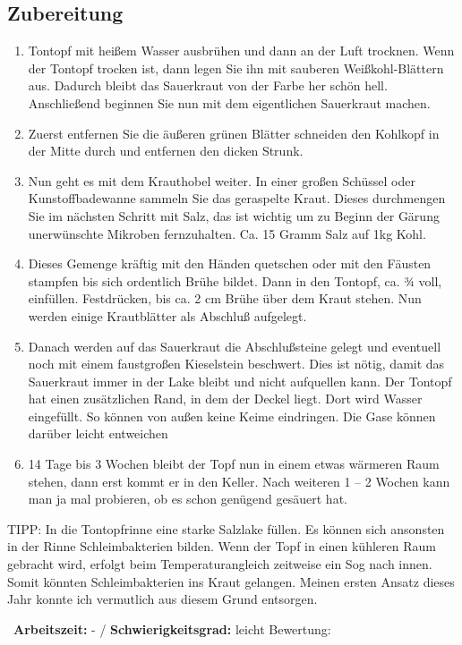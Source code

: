 \begin{minipage}[t]{0.58\textwidth}
\vspace{0pt}
\subsection*{Zubereitung}
\begin{enumerate}[leftmargin=*, itemindent=14pt]


\item Tontopf mit heißem Wasser ausbrühen und dann an der Luft trocknen. Wenn der Tontopf trocken ist, dann legen Sie ihn mit sauberen Weißkohl-Blättern aus. Dadurch bleibt das Sauerkraut von der Farbe her schön hell. Anschließend beginnen Sie nun mit dem eigentlichen Sauerkraut machen.

\item Zuerst entfernen Sie die äußeren grünen Blätter schneiden den Kohlkopf in der Mitte durch und entfernen den dicken Strunk.

\item Nun geht es mit dem Krauthobel weiter. In einer großen Schüssel oder Kunstoffbadewanne sammeln Sie das geraspelte Kraut. Dieses durchmengen Sie im nächsten Schritt mit Salz, das ist wichtig um zu Beginn der Gärung unerwünschte Mikroben fernzuhalten. Ca. 15 Gramm Salz auf 1kg Kohl.

\item Dieses Gemenge kräftig mit den Händen quetschen oder mit den Fäusten stampfen bis sich ordentlich Brühe bildet. Dann in den Tontopf, ca. ¾ voll, einfüllen. Festdrücken, bis ca. 2 cm Brühe über dem Kraut stehen. Nun werden einige Krautblätter als Abschluß aufgelegt.

\item Danach werden auf das Sauerkraut die Abschlußsteine gelegt und eventuell noch mit einem faustgroßen Kieselstein beschwert. Dies ist nötig, damit das Sauerkraut immer in der Lake bleibt und nicht aufquellen kann. Der Tontopf hat einen zusätzlichen Rand, in dem der Deckel liegt. Dort wird Wasser eingefüllt. So können von außen keine Keime eindringen. Die Gase können darüber leicht entweichen

\item 14 Tage bis 3 Wochen bleibt der Topf nun in einem etwas wärmeren Raum stehen, dann erst kommt er in den Keller. Nach weiteren 1 – 2 Wochen kann man ja mal probieren, ob es schon genügend gesäuert hat.
\end{enumerate}

TIPP: In die Tontopfrinne eine starke Salzlake füllen. Es können sich ansonsten in der Rinne Schleimbakterien bilden. Wenn der Topf in einen kühleren Raum gebracht wird, erfolgt beim Temperaturangleich zeitweise ein Sog nach innen. Somit könnten Schleimbakterien ins Kraut gelangen. Meinen ersten Ansatz dieses Jahr konnte ich vermutlich aus diesem Grund entsorgen.
    
\end{minipage}
\vfill
\decothreeright \, \textbf{Arbeitszeit:} - / \textbf{Schwierigkeitsgrad:} leicht \decothreeleft \hfill Bewertung: \Circle  \Circle \Circle  \Circle \Circle